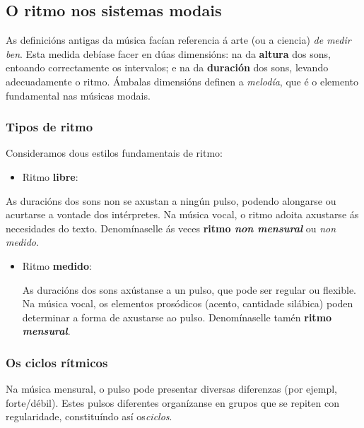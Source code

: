 \documentclass[a4paper, twoside]{templates/ociamthesis}
\providecommand{\tightlist}{%
  \setlength{\itemsep}{0pt}\setlength{\parskip}{0pt}}
\begin{document}
\hypertarget{o-ritmo-nos-sistemas-modais}{%
\subsection{O ritmo nos sistemas modais}\label{o-ritmo-nos-sistemas-modais}}

As definicións antigas da música facían referencia á arte (ou a ciencia) \emph{de medir ben}. Esta medida debíase facer en dúas dimensións: na da \textbf{altura} dos sons, entoando correctamente os intervalos; e na da \textbf{duración} dos sons, levando adecuadamente o ritmo. Ámbalas dimensións definen a \emph{melodía}, que é o elemento fundamental nas músicas modais.

\hypertarget{tipos-de-ritmo}{%
\subsubsection{Tipos de ritmo}\label{tipos-de-ritmo}}

Consideramos dous estilos fundamentais de ritmo:

\begin{itemize}
\tightlist
\item
  Ritmo \textbf{libre}:
\end{itemize}

As duracións dos sons non se axustan a ningún pulso, podendo alongarse ou acurtarse a vontade dos intérpretes. Na música vocal, o ritmo adoita axustarse ás necesidades do texto. Denomínaselle ás veces \textbf{ritmo \emph{non mensural}} ou \emph{non medido}.

\begin{itemize}
\item
  Ritmo \textbf{medido}:

  As duracións dos sons axústanse a un pulso, que pode ser regular ou flexible. Na música vocal, os elementos prosódicos (acento, cantidade silábica) poden determinar a forma de axustarse ao pulso. Denomínaselle tamén \textbf{ritmo \emph{mensural}}.
\end{itemize}

\hypertarget{os-ciclos-ruxedtmicos}{%
\subsubsection{Os ciclos rítmicos}\label{os-ciclos-ruxedtmicos}}

Na música mensural, o pulso pode presentar diversas diferenzas (por ejempl, forte/débil). Estes pulsos diferentes organízanse en grupos que se repiten con regularidade, constituíndo así os\emph{ciclos}.
\end{document}
